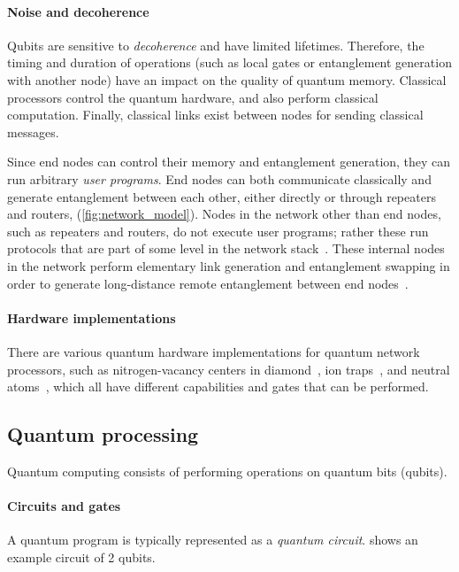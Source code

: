\paragraph{Noise and decoherence}
Qubits are sensitive to \emph{decoherence} and have limited lifetimes.
Therefore, the timing and duration of operations (such as local gates or entanglement generation with another node) have an impact on the quality of quantum memory. Classical processors control the quantum hardware, and also perform classical computation.
Finally, classical links exist between nodes for sending classical messages.

Since end nodes can control their memory and entanglement generation, they can run arbitrary \textit{user programs}.
End nodes can both communicate classically and generate entanglement between each other, either directly or through repeaters and routers, (\cref{fig:network_model}). Nodes in the network other than end nodes, such as repeaters and routers, do not execute user programs; rather these run protocols that are part of some level in the
network stack~\cite{dahlberg2019linklayer,kozlowski2020networklayer}.
These internal nodes in the network perform elementary link generation and entanglement swapping in order to generate long-distance remote entanglement between end nodes~\cite{dahlberg2019linklayer}.

\paragraph{Hardware implementations}
There are various quantum hardware implementations for quantum network processors, such as nitrogen-vacancy centers in diamond~\cite{Bernien2014}, ion traps~\cite{moehring2007entanglement}, and neutral atoms~\cite{hofmann2012heralded,ritter2012elementary}, which all have different capabilities and gates that can be performed.

\subsection{Quantum processing}
Quantum computing consists of performing operations on quantum bits (qubits).

\paragraph{Circuits and gates}
A quantum program is typically represented as a \emph{quantum circuit}.
 shows an example circuit of 2 qubits.

